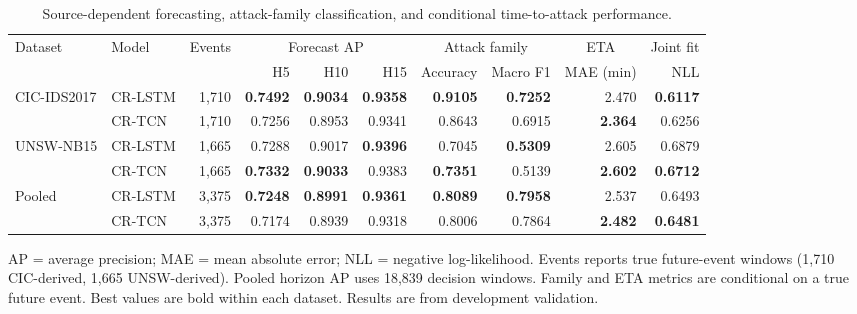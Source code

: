 \begin{table}[t]
\centering
\caption{Source-dependent forecasting, attack-family classification, and conditional time-to-attack performance.}
\label{tab:source_family_eta}
\small
\begin{tabular}{llrrrrrrrr}
\toprule
\multirow{2}{*}{Dataset} & \multirow{2}{*}{Model} & \multirow{2}{*}{Events} & \multicolumn{3}{c}{Forecast AP} & \multicolumn{2}{c}{Attack family} & \multicolumn{1}{c}{ETA} & \multicolumn{1}{c}{Joint fit} \\
\cmidrule(lr){4-6}\cmidrule(lr){7-8}
 & & & H5 & H10 & H15 & Accuracy & Macro F1 & MAE (min) & NLL \\
\midrule
\multirow{2}{*}{CIC-IDS2017} & CR-LSTM & 1,710 & \textbf{0.7492} & \textbf{0.9034} & \textbf{0.9358} & \textbf{0.9105} & \textbf{0.7252} & 2.470 & \textbf{0.6117} \\
 & CR-TCN & 1,710 & 0.7256 & 0.8953 & 0.9341 & 0.8643 & 0.6915 & \textbf{2.364} & 0.6256 \\
\midrule
\multirow{2}{*}{UNSW-NB15} & CR-LSTM & 1,665 & 0.7288 & 0.9017 & \textbf{0.9396} & 0.7045 & \textbf{0.5309} & 2.605 & 0.6879 \\
 & CR-TCN & 1,665 & \textbf{0.7332} & \textbf{0.9033} & 0.9383 & \textbf{0.7351} & 0.5139 & \textbf{2.602} & \textbf{0.6712} \\
\midrule
\multirow{2}{*}{Pooled} & CR-LSTM & 3,375 & \textbf{0.7248} & \textbf{0.8991} & \textbf{0.9361} & \textbf{0.8089} & \textbf{0.7958} & 2.537 & 0.6493 \\
 & CR-TCN & 3,375 & 0.7174 & 0.8939 & 0.9318 & 0.8006 & 0.7864 & \textbf{2.482} & \textbf{0.6481} \\
\bottomrule
\end{tabular}
\vspace{2pt}
\parbox{\textwidth}{\footnotesize AP = average precision; MAE = mean absolute error; NLL = negative log-likelihood. Events reports true future-event windows (1,710 CIC-derived, 1,665 UNSW-derived). Pooled horizon AP uses 18,839 decision windows. Family and ETA metrics are conditional on a true future event. Best values are bold within each dataset. Results are from development validation.}
\end{table}

